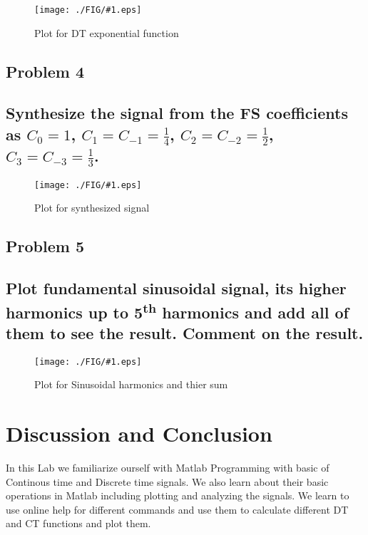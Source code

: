 \documentclass[a4paper,11pt]{article}
\newcommand\ddfrac[2]{\frac{\displaystyle #1}{\displaystyle #2}}
\newcommand{\mobs}[2]{
    \begin{figure}[H]
        \centering
        \texttt{[image: ./FIG/\#1.eps]}
        \caption{#2}
    \end{figure}
   
}
\begin{document}

\mobs{dt}{Plot for DT exponential function}



\subsection{Problem 4}
\subsection*{Synthesize the signal from the FS coefficients as $C_0=1$, $C_1=C_{-1}=\ddfrac{1}{4}$, $C_2=C_{-2}=\ddfrac{1}{2}$, $C_3=C_{-3}=\ddfrac{1}{3}$.}
\mobs{syn}{Plot for synthesized signal}



\subsection{Problem 5}
\subsection*{Plot fundamental sinusoidal signal, its higher harmonics up to 5\textsuperscript{th} harmonics and add all of them to see the result. Comment on the result.}
\mobs{harmonics}{Plot for Sinusoidal harmonics and thier sum}




\section{Discussion and Conclusion}
In this Lab we familiarize ourself with Matlab Programming with basic of Continous time and Discrete time signals. We also learn about their basic operations in Matlab including  plotting and analyzing the signals. We learn to use online help for different commands and use them to calculate different DT and CT functions and plot them.
\end{document}
